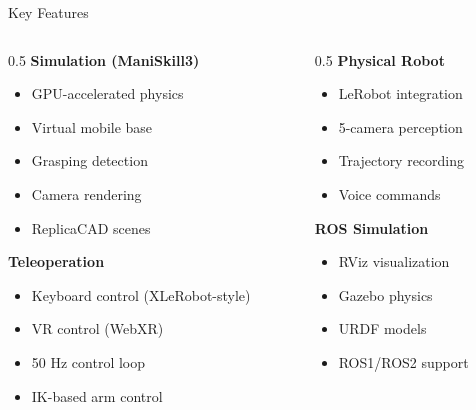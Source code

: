 \begin{frame}{Key Features}
\begin{columns}[t]
\begin{column}{0.5\textwidth}
    \textbf{Simulation (ManiSkill3)}
    \begin{itemize}
        \item GPU-accelerated physics
        \item Virtual mobile base
        \item Grasping detection
        \item Camera rendering
        \item ReplicaCAD scenes
    \end{itemize}

    \vspace{0.3cm}

    \textbf{Teleoperation}
    \begin{itemize}
        \item Keyboard control (XLeRobot-style)
        \item VR control (WebXR)
        \item 50 Hz control loop
        \item IK-based arm control
    \end{itemize}
\end{column}
\begin{column}{0.5\textwidth}
    \textbf{Physical Robot}
    \begin{itemize}
        \item LeRobot integration
        \item 5-camera perception
        \item Trajectory recording
        \item Voice commands
    \end{itemize}

    \vspace{0.3cm}

    \textbf{ROS Simulation}
    \begin{itemize}
        \item RViz visualization
        \item Gazebo physics
        \item URDF models
        \item ROS1/ROS2 support
    \end{itemize}
\end{column}
\end{columns}
\end{frame}

